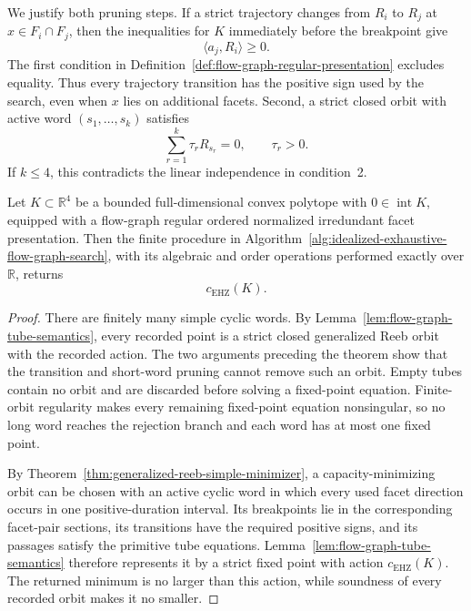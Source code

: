 We justify both pruning steps.  If a strict trajectory changes from \(R_i\) to
\(R_j\) at \(x\in F_i\cap F_j\), then the inequalities
for \(K\) immediately before the breakpoint give
\[
  \langle a_j,R_i\rangle\geq0.
\]
The first condition in
Definition~\ref{def:flow-graph-regular-presentation} excludes equality.  Thus
every trajectory transition has the positive sign used by the search, even
when \(x\) lies on additional facets.  Second, a strict closed orbit with
active word \((s_1,\ldots,s_k)\) satisfies
\[
  \sum_{r=1}^k\tau_rR_{s_r}=0,
  \qquad \tau_r>0.
\]
If \(k\leq4\), this contradicts the linear independence in condition~2.

\begin{theorem}
\label{thm:exact-flow-graph-correctness}
Let \(K\subset\mathbb R^4\) be a bounded full-dimensional convex polytope
with \(0\in\operatorname{int}K\), equipped with a flow-graph regular ordered
normalized irredundant facet presentation.  Then the finite procedure in
Algorithm~\ref{alg:idealized-exhaustive-flow-graph-search}, with its algebraic
and order operations performed exactly over \(\mathbb R\), returns
\[
  c_{\mathrm{EHZ}}(K).
\]
\end{theorem}

\begin{proof}
There are finitely many simple cyclic words.  By
Lemma~\ref{lem:flow-graph-tube-semantics}, every recorded point is a strict
closed generalized Reeb orbit with the recorded action.  The two arguments
preceding the theorem show that the transition and short-word pruning cannot
remove such an orbit. Empty tubes contain no orbit and are discarded before
solving a fixed-point equation. Finite-orbit regularity makes every remaining
fixed-point equation nonsingular, so no long word reaches the rejection
branch and each word has at most one fixed point.

By Theorem~\ref{thm:generalized-reeb-simple-minimizer}, a capacity-minimizing
orbit can be chosen with an active cyclic word in which every used facet
direction occurs in one positive-duration interval.  Its breakpoints lie in
the corresponding facet-pair sections, its transitions have the required
positive signs, and its passages satisfy the primitive tube equations.
Lemma~\ref{lem:flow-graph-tube-semantics} therefore represents it by a strict
fixed point with action \(c_{\mathrm{EHZ}}(K)\).  The returned minimum is no
larger than this action, while soundness of every recorded orbit makes it no
smaller.
\end{proof}

